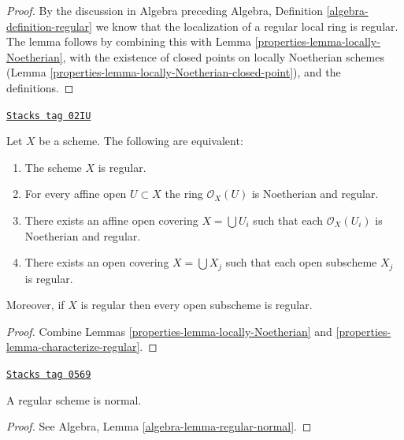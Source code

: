 \begin{proof}

By the discussion in Algebra preceding Algebra, Definition
\ref{algebra-definition-regular} we know that the localization of
a regular local ring is regular. The lemma follows
by combining this with Lemma \ref{properties-lemma-locally-Noetherian},
with the existence of closed
points on locally Noetherian schemes
(Lemma \ref{properties-lemma-locally-Noetherian-closed-point}), and
the definitions.
\end{proof}

\begin{lemma}
\label{properties-lemma-locally-regular}
\href{https://stacks.math.columbia.edu/tag/02IU}{\texttt{Stacks tag 02IU}}

Let $X$ be a scheme. The following are equivalent:
\begin{enumerate}
\item The scheme $X$ is regular.
\item For every affine open $U \subset X$ the ring $\mathcal{O}_X(U)$
is Noetherian and regular.
\item There exists an affine open covering $X = \bigcup U_i$ such that
each $\mathcal{O}_X(U_i)$ is Noetherian and regular.
\item There exists an open covering $X = \bigcup X_j$
such that each open subscheme $X_j$ is regular.
\end{enumerate}
Moreover, if $X$ is regular then every open subscheme is regular.
\end{lemma}

\begin{proof}

Combine Lemmas \ref{properties-lemma-locally-Noetherian}
and \ref{properties-lemma-characterize-regular}.
\end{proof}

\begin{lemma}
\label{properties-lemma-regular-normal}
\href{https://stacks.math.columbia.edu/tag/0569}{\texttt{Stacks tag 0569}}

A regular scheme is normal.
\end{lemma}

\begin{proof}
See
Algebra, Lemma \ref{algebra-lemma-regular-normal}.
\end{proof}

